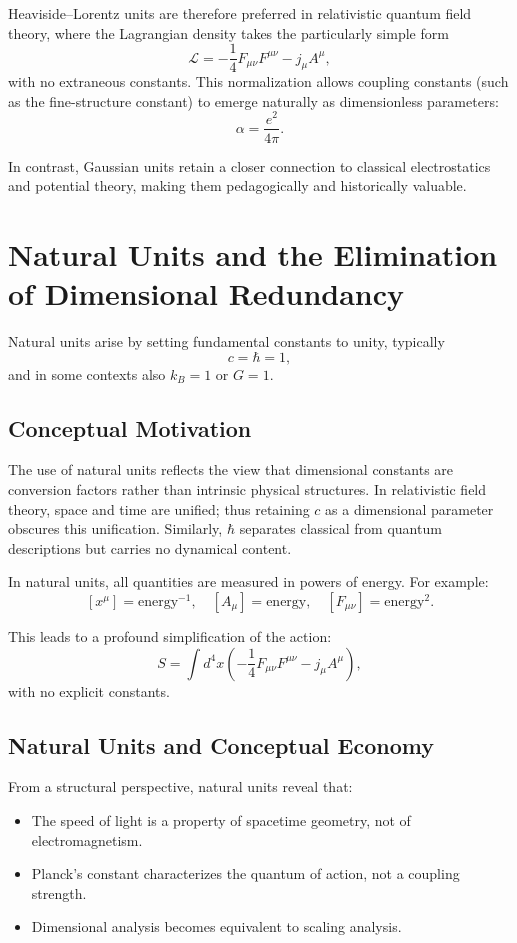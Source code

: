 \documentclass[12pt]{article}
\begin{document}
Heaviside–Lorentz units are therefore preferred in relativistic quantum field theory, where the Lagrangian density takes the particularly simple form
\[
\mathcal{L} = -\frac{1}{4} F_{\mu\nu}F^{\mu\nu} - j_\mu A^\mu,
\]
with no extraneous constants. This normalization allows coupling constants (such as the fine-structure constant) to emerge naturally as dimensionless parameters:
\[
\alpha = \frac{e^2}{4\pi}.
\]

In contrast, Gaussian units retain a closer connection to classical electrostatics and potential theory, making them pedagogically and historically valuable.

\section{Natural Units and the Elimination of Dimensional Redundancy}

Natural units arise by setting fundamental constants to unity, typically
\[
c = \hbar = 1,
\]
and in some contexts also $k_B = 1$ or $G = 1$.

\subsection{Conceptual Motivation}

The use of natural units reflects the view that dimensional constants are conversion factors rather than intrinsic physical structures. In relativistic field theory, space and time are unified; thus retaining $c$ as a dimensional parameter obscures this unification. Similarly, $\hbar$ separates classical from quantum descriptions but carries no dynamical content.

In natural units, all quantities are measured in powers of energy. For example:
\[
[x^\mu] = \text{energy}^{-1}, \quad [A_\mu] = \text{energy}, \quad [F_{\mu\nu}] = \text{energy}^2.
\]

This leads to a profound simplification of the action:
\[
S = \int d^4x \left( -\frac{1}{4} F_{\mu\nu}F^{\mu\nu} - j_\mu A^\mu \right),
\]
with no explicit constants.

\subsection{Natural Units and Conceptual Economy}

From a structural perspective, natural units reveal that:
\begin{itemize}
\item The speed of light is a property of spacetime geometry, not of electromagnetism.
\item Planck’s constant characterizes the quantum of action, not a coupling strength.
\item Dimensional analysis becomes equivalent to scaling analysis.
\end{itemize}
\end{document}
